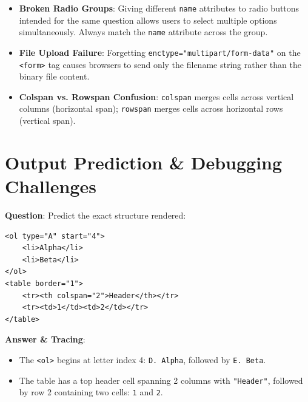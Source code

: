 \begin{examtip}
\begin{itemize}[leftmargin=1.5em]
    \item \textbf{Broken Radio Groups}: Giving different \texttt{name} attributes to radio buttons intended for the same question allows users to select multiple options simultaneously. Always match the \texttt{name} attribute across the group.
    \item \textbf{File Upload Failure}: Forgetting \texttt{enctype="multipart/form-data"} on the \texttt{<form>} tag causes browsers to send only the filename string rather than the binary file content.
    \item \textbf{Colspan vs. Rowspan Confusion}: \texttt{colspan} merges cells across vertical columns (horizontal span); \texttt{rowspan} merges cells across horizontal rows (vertical span).
\end{itemize}
\end{examtip}

\section{Output Prediction \& Debugging Challenges}

\begin{outputprediction}
\textbf{Question}: Predict the exact structure rendered:
\begin{lstlisting}[language=HTML5]
<ol type="A" start="4">
    <li>Alpha</li>
    <li>Beta</li>
</ol>
<table border="1">
    <tr><th colspan="2">Header</th></tr>
    <tr><td>1</td><td>2</td></tr>
</table>
\end{lstlisting}
\textbf{Answer \& Tracing}:
\begin{itemize}
    \item The \texttt{<ol>} begins at letter index 4: \texttt{D. Alpha}, followed by \texttt{E. Beta}.
    \item The table has a top header cell spanning 2 columns with \texttt{"Header"}, followed by row 2 containing two cells: \texttt{1} and \texttt{2}.
\end{itemize}
\end{outputprediction}

